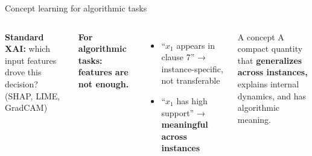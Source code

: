 \documentclass[aspectratio=169,10pt,dvipsnames]{beamer}
\begin{document}
\begin{frame}{Concept learning for algorithmic tasks}

\begin{columns}[T]
\textbf{Standard XAI:} which input features drove this decision?\\
\small (SHAP, LIME, GradCAM)

\medskip\small
{}

\textbf{For algorithmic tasks: features are not enough.}
\begin{itemize}\small
  \item ``$x_1$ appears in clause 7'' → instance-specific, not transferable
  \item ``$x_1$ has high support'' → \textbf{meaningful across instances}
\end{itemize}

\medskip
\begin{block}{A concept}
\small A compact quantity that \textbf{generalizes across instances,}\\
explains internal dynamics, and has algorithmic meaning.
\end{block}
\end{columns}

\end{frame}
\end{document}
